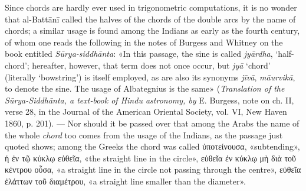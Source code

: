 \documentclass[11pt]{article}
\begin{document}
\par Since chords are hardly ever used in trigonometric computations, it is no wonder that al-Battānī called the halves of the chords of the double arcs by the name of chords; a similar usage is found among the Indians as early as the fourth century, of whom one reads the following in the notes of Burgess and Whitney on the book entitled \emph{Sūrya-siddhānta}: «In this passage, the sine is called \emph{jyārdha}, ‘half-chord’; hereafter, however, that term does not once occur, but \emph{jyā} ‘chord’ (literally ‘bowstring’) is itself employed, as are also its synonyms \emph{jīvā}, \emph{māurvikā}, to denote the sine. The usage of Albategnius is the same» (\emph{Translation of the Sūrya-Siddhānta, a text-book of Hindu astronomy, by} E. Burgess, note on ch. II, verse 28, in the Journal of the American Oriental Society, vol. VI, New Haven 1860, p. 201). — Nor should it be passed over that among the Arabs the name of the whole \emph{chord} too comes from the usage of the Indians, as the passage just quoted shows; among the Greeks the chord was called {\greekfont ὑποτείνουσα}, «subtending», {\greekfont ἡ ἐν τῷ κύκλῳ εὐθεῖα}, «the straight line in the circle», {\greekfont εὐθεῖα ἐν κύκλῳ μὴ διὰ τοῦ κέντρου οὖσα}, «a straight line in the circle not passing through the centre», {\greekfont εὐθεῖα ἐλάττων τοῦ διαμέτρου}, «a straight line smaller than the diameter».\par
\end{document}
